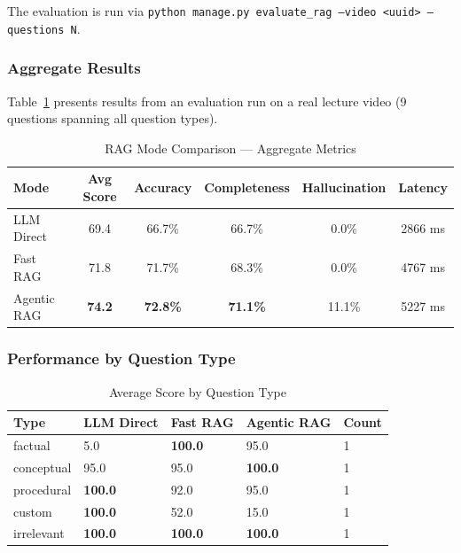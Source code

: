 The evaluation is run via \texttt{python manage.py evaluate\_rag --video \textless{}uuid\textgreater{} --questions N}.

\subsubsection{Aggregate Results}

Table~\ref{tab:rag-eval} presents results from an evaluation run on a real lecture video (9 questions spanning all question types).

\begin{table}[H]
    \centering
    \caption{RAG Mode Comparison --- Aggregate Metrics}
    \label{tab:rag-eval}
    \begin{tabular}{@{}lccccc@{}}
        \toprule
        \textbf{Mode} & \textbf{Avg Score} & \textbf{Accuracy} & \textbf{Completeness} & \textbf{Hallucination} & \textbf{Latency} \\ \midrule
        LLM Direct   & 69.4 & 66.7\% & 66.7\% & 0.0\%  & 2866 ms \\
        Fast RAG     & 71.8 & 71.7\% & 68.3\% & 0.0\%  & 4767 ms \\
        Agentic RAG  & \textbf{74.2} & \textbf{72.8\%} & \textbf{71.1\%} & 11.1\% & 5227 ms \\ \bottomrule
    \end{tabular}
\end{table}

\subsubsection{Performance by Question Type}

\begin{table}[H]
    \centering
    \caption{Average Score by Question Type}
    \begin{tabular}{@{}lllll@{}}
        \toprule
        \textbf{Type} & \textbf{LLM Direct} & \textbf{Fast RAG} & \textbf{Agentic RAG} & \textbf{Count} \\ \midrule
        factual    & 5.0  & \textbf{100.0} & 95.0  & 1 \\
        conceptual & 95.0 & 95.0  & \textbf{100.0} & 1 \\
        procedural & \textbf{100.0} & 92.0  & 95.0  & 1 \\
        custom     & \textbf{100.0} & 52.0  & 15.0  & 1 \\
        irrelevant & \textbf{100.0} & \textbf{100.0} & \textbf{100.0} & 1 \\ \bottomrule
    \end{tabular}
\end{table}

